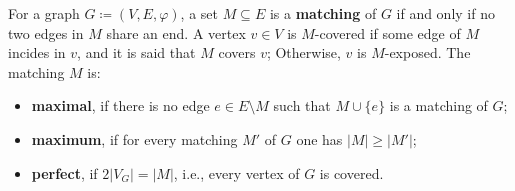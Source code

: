 \begin{definition}[Matching]
	\label{def:matching}
	For a graph \(G \coloneqq (V, E, \varphi)\), a set \(M \subseteq E\) is a \textbf{matching} of \(G\) if and only if no two edges in \(M\) share an end.
	A vertex \(v \in V\) is \(M\)-covered if some edge of \(M\) incides in \(v\), 
	and it is said that \(M\) covers \(v\);
	Otherwise, \(v\) is \(M\)-exposed.
	The matching \(M\) is:
	\begin{itemize}
		\item 
			\textbf{maximal}, if there is no edge \(e \in E \setminus M\) such that \(M \cup \{e\}\) is a matching of \(G\);

		\item
			\textbf{maximum}, if for every matching \(M'\) of \(G\) one has \(|M| \geq |M'|\);
	
		\item
			\textbf{perfect}, if \(2|V_G| = |M|\), i.e., every vertex of \(G\) is covered.
	\end{itemize}
\end{definition}

